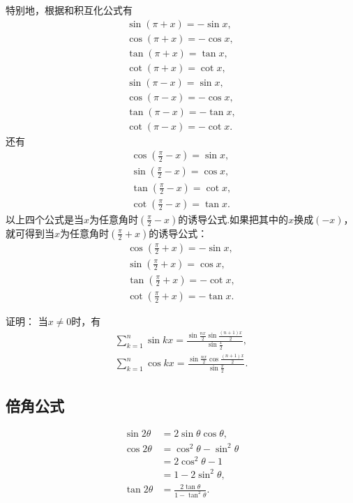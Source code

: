 特别地，根据和积互化公式有
\begin{gather}
	\sin(\pi+x) = -\sin x, \\
	\cos(\pi+x) = -\cos x, \\
	\tan(\pi+x) = \tan x, \\
	\cot(\pi+x) = \cot x, \\
	\sin(\pi-x) = \sin x, \\
	\cos(\pi-x) = -\cos x, \\
	\tan(\pi-x) = -\tan x, \\
	\cot(\pi-x) = -\cot x.
\end{gather}
还有
\begin{gather}
	\cos\left(\frac{\pi}{2}-x\right) = \sin x, \\
	\sin\left(\frac{\pi}{2}-x\right) = \cos x, \\
	\tan\left(\frac{\pi}{2}-x\right) = \cot x, \\
	\cot\left(\frac{\pi}{2}-x\right) = \tan x.
\end{gather}
以上四个公式是当\(x\)为任意角时\(\left(\frac{\pi}{2}-x\right)\)的诱导公式.如果把其中的\(x\)换成\((-x)\)，就可得到当\(x\)为任意角时\(\left(\frac{\pi}{2}+x\right)\)的诱导公式：
\begin{gather}
	\cos\left(\frac{\pi}{2}+x\right) = -\sin x, \\
	\sin\left(\frac{\pi}{2}+x\right) = \cos x, \\
	\tan\left(\frac{\pi}{2}+x\right) = -\cot x, \\
	\cot\left(\frac{\pi}{2}+x\right) = -\tan x.
\end{gather}

\begin{example}
\def\s{\sum\limits_{k=1}^n}%
证明：
当\(x\neq0\)时，有
\begin{gather}
	\s \sin kx
	= \frac{\sin\frac{nx}{2} \sin\frac{(n+1)x}{2}}{\sin\frac{x}{2}}, \\
	\s \cos kx
	= \frac{\sin\frac{nx}{2} \cos\frac{(n+1)x}{2}}{\sin\frac{x}{2}}.
\end{gather}
\end{example}

\subsection{倍角公式}
\begin{theorem}[二倍角公式]
\begin{align}
	\sin 2 \theta &= 2 \sin \theta \cos \theta, \\
	\cos 2 \theta &= \cos^2 \theta - \sin^2 \theta \\
		&= 2 \cos^2 \theta - 1 \\
		&= 1 - 2 \sin^2 \theta, \\
	\tan 2 \theta &= \frac{2 \tan \theta}{1 - \tan^2 \theta}.
\end{align}
\end{theorem}

